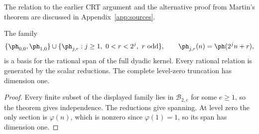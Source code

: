 \documentclass[11pt]{article}
\begin{document}
The relation to the earlier CRT argument and the alternative proof from
Martin's theorem are discussed in Appendix~\ref{app:sources}.

\begin{corollary}\label{res:basis}
The family
\[
 \{\ph_{0,0},\ph_{1,0}\}
 \cup\{\ph_{j,r}:j\ge1,\ 0<r<2^j,\ r\text{ odd}\},
 \qquad \ph_{j,r}(n)=\ph(2^jn+r),
\]
is a basis for the rational span of the full dyadic kernel. Every rational
relation is generated by the scalar reductions. The complete level-zero
truncation has dimension one.
\end{corollary}
\begin{proof}
Every finite subset of the displayed family lies in $\mathcal B_{2,e}$
for some $e\ge1$, so the theorem gives independence. The reductions give
spanning.
At level zero the only section is $\varphi(n)$, which is nonzero since
$\varphi(1)=1$, so its span has dimension one.
\end{proof}
\end{document}
